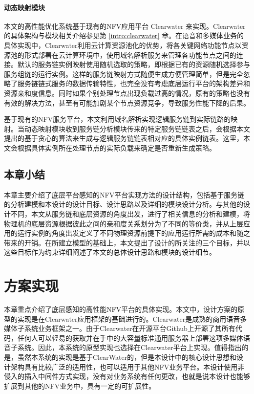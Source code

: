 \subsubsection{动态映射模块}
本文的高性能优化系统基于现有的NFV应用平台 Clearwater 来实现。Clearwater的具体架构与模块相关介绍参见第 \ref{intro:clearwater} 章。在语音和多媒体业务的具体实现中，Clearwater利用云计算资源池化的优势，将各关键网络功能节点以资源池的形式部署在云计算环境中，使用域名解析服务来管理各功能节点之间的连接。默认的服务链实例映射使用随机选取的策略，即根据已有的资源随机选择参与服务组链的运行实例。这样的服务链映射方式随便生成方便管理简单，但是完全忽略了服务链链式服务的数据传输特性，也完全没有考虑底层运行平台的架构差异和资源亲和度信息。同时如果个别处理节点出现负载过高的情况，原有的策略也没有有效的解决方法，甚至有可能加剧某个节点资源竞争，导致服务性能下降的后果。

基于现有的NFV服务平台，本文利用域名解析实现逻辑服务链到实际链路的映射。当动态映射模块收到服务链分析模块传来的特定服务链链表之后，会根据本文提出的基于贪心的算法来生成与逻辑服务链链表相对应的具体实例链表。这里，本文会根据具体实例所在处理节点的实际负载来确定是否重新生成策略。

\section{本章小结}
本章主要介绍了底层平台感知的NFV平台实现方法的设计结构，包括基于服务链的分析建模和本设计的设计目标、设计思路以及详细的模块设计分析。与其他的设计不同，本文从服务链和底层资源的角度出发，进行了相关信息的分析和建模，将物理机的底层资源根据彼此之间的亲和度关系划分为了不同的等价类，并从上层应用的运行实例的角度出发定义了不同物理资源前提下的应用运行所需的成本和随之带来的开销。在所建立模型的基础上，本文提出了设计的所关注的三个目标，并以这些目标作为约束详细阐述了本文的总体设计思路和模块的设计细节。

\chapter{方案实现}
\label{chapter:implement}
本章重点介绍了底层感知的高性能NFV平台的具体实现。本文中，设计方案的原型的实现是在Clearwater应用框架的基础进行的。Clearwater是成熟的商用语音多媒体子系统业务框架之一。由于Clearwater在开源平台Github上开源了其所有代码，任何人可以轻易的获取并在手中的大容量标准通用服务器上部署这项多媒体语音子系统。因此，本系统的原型实现也选择在Clearwater平台上实现。值得指出的是，虽然本系统的实现是基于ClearWater的，但是本设计中的核心设计思想和设计架构具有比较广泛的适用性，也可以适用于其他NFV业务平台。本设计使用非侵入的插入中间件方式实现，没有对业务系统有任何更改，也就是说本设计也能够扩展到其他的NFV业务中，具有一定的可扩展性。
